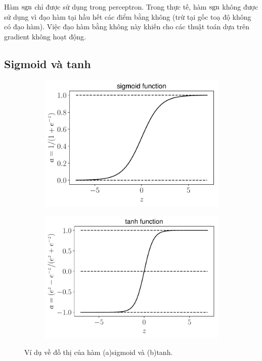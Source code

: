 Hàm $\text{sgn}$ chỉ được sử dụng trong perceptron. Trong thực tế, hàm
$\text{sgn}$ không được sử dụng vì đạo hàm tại hầu hết các điểm bằng không (trừ
tại gốc toạ độ không có đạo hàm). Việc đạo hàm bằng không này khiến cho các thuật toán dựa trên gradient không hoạt động.

\subsection{Sigmoid và tanh}
\begin{figure}[t]
\begin{subfigure}{0.49\textwidth}
\includegraphics[width=0.99\linewidth]{ebookML_src/src/mlp/sigmoid.pdf}
\caption{}
\label{fig:14_5a}
\end{subfigure}
\begin{subfigure}{0.49\textwidth}
\includegraphics[width=0.99\linewidth]{ebookML_src/src/mlp/tanh.pdf}
\caption{}
\label{fig:14_5b}
\end{subfigure}
\caption{
Ví dụ về đồ thị của hàm (a){sigmoid} và (b){tanh}.
}
\label{fig:14_5}
\end{figure}
